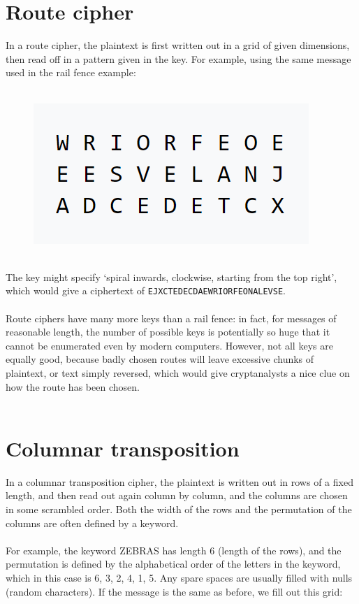 \documentclass[Lau,binding=0.6cm,oneside]{sapthesis}
\begin{document}
\begin{appendices}
\section{Route cipher}
In a route cipher, the plaintext is first written out in a grid of given dimensions, then read off in a pattern given in the key. For example, using the same message used in the rail fence example:\\\\
\begin{figure}[H]
\includegraphics[scale=0.42]{route}
\centering
\caption{}
\centering
\end{figure}
\ \\
The key might specify `spiral inwards, clockwise, starting from the top right', which would give a ciphertext of \colorbox{gray!12}{\small{\texttt{EJXCTEDECDAEWRIORFEONALEVSE}}}.\\\\
Route ciphers have many more keys than a rail fence: in fact, for messages of reasonable length, the number of possible keys is potentially so huge that it cannot be enumerated even by modern computers. However, not all keys are equally good, because badly chosen routes will leave excessive chunks of plaintext, or text simply reversed, which would give cryptanalysts a nice clue on how the route has been chosen.\\\\

\section{Columnar transposition}
In a columnar transposition cipher, the plaintext is written out in rows of a fixed length, and then read out again column by column, and the columns are chosen in some scrambled order. Both the width of the rows and the permutation of the columns are often defined by a keyword.\\\\For example, the keyword \textsf{ZEBRAS} has length 6 (length of the rows), and the permutation is defined by the alphabetical order of the letters in the keyword, which in this case is 6, 3, 2, 4, 1, 5. Any spare spaces are usually filled with nulls (random characters). If the message is the same as before, we fill out this grid:\\\\


\end{appendices}
\end{document}
